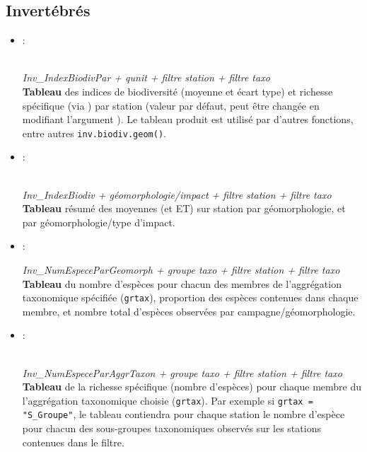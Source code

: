 \documentclass{article}
\begin{document}
\subsection{Invertébrés}
\label{test}
\begin{itemize}

  \item[] \hypertarget{i1}{:} \\
    \emph{Inv\_IndexBiodivPar + qunit + filtre station + filtre taxo} \\
  \textbf{Tableau} des indices de biodiversité (moyenne et écart type)
  et richesse spécifique (via ) par station (valeur par défaut, peut être
  changée en modifiant l'argument ). Le tableau produit
  est utilisé par d'autres fonctions, entre autres \texttt{inv.biodiv.geom()}.

  \item[] \hypertarget{i2}{:}\\
    \emph{Inv\_IndexBiodiv + géomorphologie/impact + filtre station + filtre taxo}\\
    \textbf{Tableau} résumé des moyennes (et ET) sur station par
    géomorphologie, et par géomorphologie/type d'impact.

  \item[] \hypertarget{i3}{:}
    \emph{Inv\_NumEspeceParGeomorph + groupe taxo + filtre station +
      filtre taxo} \\
    \textbf{Tableau} du nombre d'espèces pour chacun des membres de
    l'aggrégation taxonomique spécifiée (\texttt{grtax}), proportion
    des espèces contenues dans chaque membre, et nombre total
    d'espèces observées par campagne/géomorphologie.

  \item[] \hypertarget{i4}{:}\\
    \emph{Inv\_NumEspeceParAggrTaxon + groupe taxo + filtre station + filtre taxo} \\
    \textbf{Tableau} de la richesse spécifique (nombre d'espèces) pour
 chaque membre du l'aggrégation taxonomique choisie
    (\texttt{grtax}). Par exemple si \texttt{grtax = "S\_Groupe"}, le
    tableau contiendra pour chaque station le nombre d'espèce pour
    chacun des sous-groupes taxonomiques observés sur les stations
    contenues dans le filtre.


\end{itemize}
\end{document}
